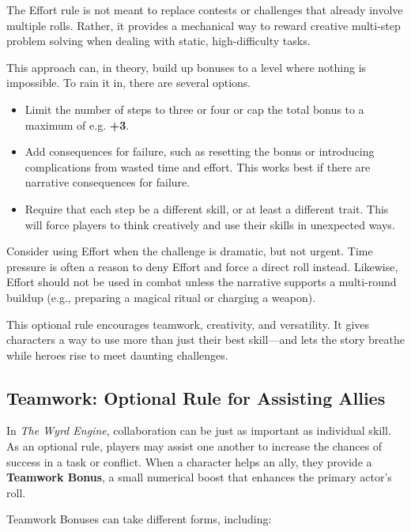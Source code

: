 \begin{multicols}{2}
The Effort rule is not meant to replace contests or challenges that already involve multiple rolls. Rather, it provides a mechanical way to reward creative multi-step problem solving when dealing with static, high-difficulty tasks.

\begin{GmTips}
    This approach can, in theory, build up bonuses to a level where nothing is impossible. To rain it in, there are several options.
    \begin{itemize}
        \item Limit the number of steps to three or four or cap the total bonus to a maximum of e.g. \textbf{+3}.
        \item Add consequences for failure, such as resetting the bonus or introducing complications from wasted time and effort. This works best if there are narrative consequences for failure.
        \item Require that each step be a different skill, or at least a different trait. This will force players to think creatively and use their skills in unexpected ways.
    \end{itemize}

    Consider using Effort when the challenge is dramatic, but not urgent. Time pressure is often a reason to deny Effort and force a direct roll instead. Likewise, Effort should not be used in combat unless the narrative supports a multi-round buildup (e.g., preparing a magical ritual or charging a weapon).
\end{GmTips}

This optional rule encourages teamwork, creativity, and versatility. It gives characters a way to use more than just their best skill—and lets the story breathe while heroes rise to meet daunting challenges.



\subsection{Teamwork: Optional Rule for Assisting Allies}

In \textit{The Wyrd Engine}, collaboration can be just as important as individual skill. As an optional rule, players may assist one another to increase the chances of success in a task or conflict. When a character helps an ally, they provide a \textbf{Teamwork Bonus}, a small numerical boost that enhances the primary actor’s roll.  

Teamwork Bonuses can take different forms, including:  


\end{multicols}
